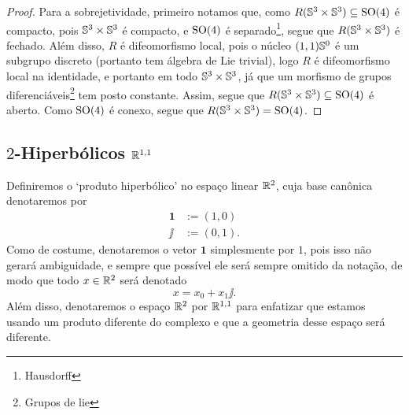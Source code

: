 \begin{proof}
Para a sobrejetividade, primeiro notamos que, como $R(\S^3 \times \S^3) \subseteq \SO(4)$ é compacto, pois $\S^3 \times \S^3$ é compacto, e $\SO(4)$ é separado\footnote{Hausdorff}, segue que $R(\S^3 \times \S^3)$ é fechado. Além disso, $R$ é difeomorfismo local, pois o núcleo $(1,1)\S^0$ é um subgrupo discreto (portanto tem álgebra de Lie trivial), logo $R$ é difeomorfismo local na identidade, e portanto em todo $\S^3 \times \S^3$, já que um morfismo de grupos diferenciáveis\footnote{Grupos de lie} tem posto constante. Assim, segue que $R(\S^3 \times \S^3) \subseteq \SO(4)$ é aberto. Como $\SO(4)$ é conexo, segue que $R(\S^3 \times \S^3) = \SO(4)$.
\end{proof}



\begin{comment}

Lembremos que, pela decomposição polar, todo $u \in \S^3$ pode ser escrito como
	\begin{equation*}
	u = \cos(\phi) + \sin(\phi)\hat{u} = \ee^{\phi \hat{u}},
	\end{equation*}
com $\phi = \cos(\esc{u}) \in \intff{0}{\tau \div 2}$ e $\hat{u} = \frac{\vec{u}}{\nor{\hat{u}}} \in \vec{\S}^2$.





Definimos a função
	\begin{align*}
	\func{R}{\S^3 \times \S^3}{\SO(3)}{(u,u')}{
		\begin{aligned}[t]
		\func{R^{2\phi}_{\hat{u}}}{\vec{\R}^3}{\vec{\R}^3}{x}{\ee^{\phi \hat{u}}x\ee^{-\phi \hat{u}}}
		\end{aligned}
	}
	\end{align*}

\end{comment}















\subsection{$2$-Hiperbólicos $\R^{1,1}$}

Definiremos o `produto hiperbólico' no espaço linear $\R^2$, cuja base canônica denotaremos por
	\begin{align*}
	\bm 1 &:= (1,0) \\
	\jj &:= (0,1).
	\end{align*}
Como de costume, denotaremos o vetor $\bm 1$ simplesmente por $1$, pois isso não gerará ambiguidade, e sempre que possível ele será sempre omitido da notação, de modo que todo $x \in \R^2$ será denotado
	\begin{equation*}
	x = x_0 + x_1 \jj.
	\end{equation*}
Além disso, denotaremos o espaço $\R^2$ por $\R^{1,1}$ para enfatizar que estamos usando um produto diferente do complexo e que a geometria desse espaço será diferente.

